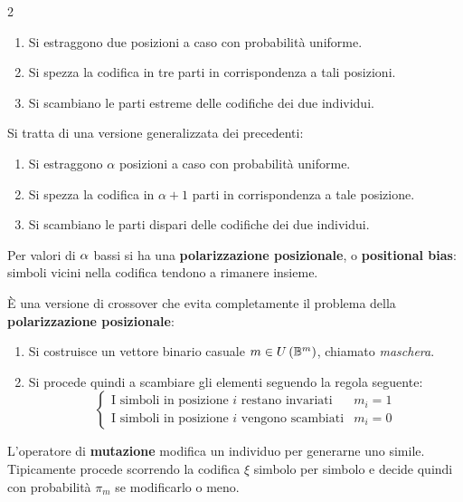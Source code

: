 \documentclass[\main/main.tex]{subfiles}
\begin{document}
\begin{multicols}{2}
\begin{definition}
\begin{enumerate}
            \item Si estraggono due posizioni a caso con probabilità uniforme.
            \item Si spezza la codifica in tre parti in corrispondenza a tali posizioni.
            \item Si scambiano le parti estreme delle codifiche dei due individui.
        \end{enumerate}
    \end{definition}
    \begin{definition}
        Si tratta di una versione generalizzata dei precedenti:
        \begin{enumerate}
            \item Si estraggono \(\alpha\) posizioni a caso con probabilità uniforme.
            \item Si spezza la codifica in \(\alpha+1\) parti in corrispondenza a tale posizione.
            \item Si scambiano le parti dispari delle codifiche dei due individui.
        \end{enumerate}
        Per valori di \(\alpha\) bassi si ha una \textbf{polarizzazione posizionale}, o \textbf{positional bias}: simboli vicini nella codifica tendono a rimanere insieme.
    \end{definition}
    \begin{definition}
        È una versione di crossover che evita completamente il problema della \textbf{polarizzazione posizionale}:
        \begin{enumerate}
            \item Si costruisce un vettore binario casuale \(m \in U\left(\mathbb{B}^m\right)\), chiamato \textit{maschera}.
            \item Si procede quindi a scambiare gli elementi seguendo la regola seguente:
            \[
                \begin{cases}
                    \text{I simboli in posizione \(i\) restano invariati} &m_i=1\\
                    \text{I simboli in posizione \(i\) vengono scambiati} &m_i=0
                \end{cases}
            \]
        \end{enumerate}
    \end{definition}
\begin{definition}[Mutazione]
    L'operatore di \textbf{mutazione} modifica un individuo per generarne uno simile. Tipicamente procede scorrendo la codifica \(\xi\) simbolo per simbolo e decide quindi con probabilità \(\pi_m\) se modificarlo o meno.

\end{definition}
\end{multicols}
\end{document}
